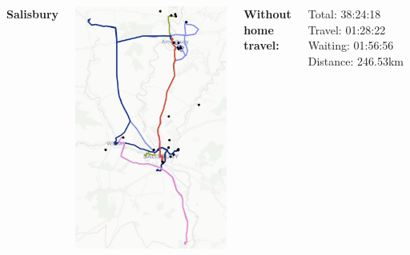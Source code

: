 \documentclass[usenames,dvipsnames]{beamer}
\begin{document}
\begin{frame} 
	\begin{columns}
		\begin{minipage}[c][0.05\textheight][c]{\linewidth}
			\textbf{Salisbury}
		\end{minipage}
		\begin{minipage}[c][0.7\textheight][c]{\linewidth}
			\centering
			\includegraphics[width=0.7\linewidth]{figures/ogSalisbury}
		\end{minipage}
		\begin{minipage}[c][0.2\textheight][c]{\linewidth}
			\scriptsize
			\hspace{17mm}\textbf{Without home travel:}
			\begin{itemize}
				\setlength{\itemindent}{0.5in}
				\setlength\itemsep{-0.2em}
				\aitem Total: 38:24:18
				\aitem Travel: 01:28:22
				\aitem Waiting: 01:56:56
				\aitem Distance: 246.53km
			\end{itemize}
		\end{minipage}
		\begin{minipage}[c][0.05\textheight][c]{\linewidth}

\end{minipage}
\end{columns}
\end{frame}
\end{document}

